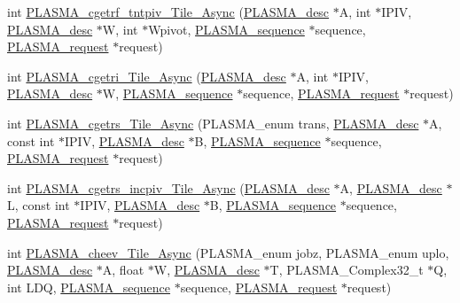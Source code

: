 \begin{DoxyCompactItemize}
\item 
int \hyperlink{group__PLASMA__Complex32__t__Tile__Async_gab52d3534e6fcfe9a2b00b7a97257ddee_gab52d3534e6fcfe9a2b00b7a97257ddee}{P\+L\+A\+S\+M\+A\+\_\+cgetrf\+\_\+tntpiv\+\_\+\+Tile\+\_\+\+Async} (\hyperlink{structplasma__desc__t}{P\+L\+A\+S\+M\+A\+\_\+desc} $\ast$A, int $\ast$I\+P\+I\+V, \hyperlink{structplasma__desc__t}{P\+L\+A\+S\+M\+A\+\_\+desc} $\ast$W, int $\ast$Wpivot, \hyperlink{structplasma__sequence__t}{P\+L\+A\+S\+M\+A\+\_\+sequence} $\ast$sequence, \hyperlink{structplasma__request__t}{P\+L\+A\+S\+M\+A\+\_\+request} $\ast$request)
\item 
int \hyperlink{group__PLASMA__Complex32__t__Tile__Async_ga6d18ea785cd0131e1752ae2eb0e14e76_ga6d18ea785cd0131e1752ae2eb0e14e76}{P\+L\+A\+S\+M\+A\+\_\+cgetri\+\_\+\+Tile\+\_\+\+Async} (\hyperlink{structplasma__desc__t}{P\+L\+A\+S\+M\+A\+\_\+desc} $\ast$A, int $\ast$I\+P\+I\+V, \hyperlink{structplasma__desc__t}{P\+L\+A\+S\+M\+A\+\_\+desc} $\ast$W, \hyperlink{structplasma__sequence__t}{P\+L\+A\+S\+M\+A\+\_\+sequence} $\ast$sequence, \hyperlink{structplasma__request__t}{P\+L\+A\+S\+M\+A\+\_\+request} $\ast$request)
\item 
int \hyperlink{group__PLASMA__Complex32__t__Tile__Async_gaaac38ebd4bb530071f91f9ecaecbb3d5_gaaac38ebd4bb530071f91f9ecaecbb3d5}{P\+L\+A\+S\+M\+A\+\_\+cgetrs\+\_\+\+Tile\+\_\+\+Async} (P\+L\+A\+S\+M\+A\+\_\+enum trans, \hyperlink{structplasma__desc__t}{P\+L\+A\+S\+M\+A\+\_\+desc} $\ast$A, const int $\ast$I\+P\+I\+V, \hyperlink{structplasma__desc__t}{P\+L\+A\+S\+M\+A\+\_\+desc} $\ast$B, \hyperlink{structplasma__sequence__t}{P\+L\+A\+S\+M\+A\+\_\+sequence} $\ast$sequence, \hyperlink{structplasma__request__t}{P\+L\+A\+S\+M\+A\+\_\+request} $\ast$request)
\item 
int \hyperlink{group__PLASMA__Complex32__t__Tile__Async_ga9bcd7cb920176038984cf1490a80c996_ga9bcd7cb920176038984cf1490a80c996}{P\+L\+A\+S\+M\+A\+\_\+cgetrs\+\_\+incpiv\+\_\+\+Tile\+\_\+\+Async} (\hyperlink{structplasma__desc__t}{P\+L\+A\+S\+M\+A\+\_\+desc} $\ast$A, \hyperlink{structplasma__desc__t}{P\+L\+A\+S\+M\+A\+\_\+desc} $\ast$L, const int $\ast$I\+P\+I\+V, \hyperlink{structplasma__desc__t}{P\+L\+A\+S\+M\+A\+\_\+desc} $\ast$B, \hyperlink{structplasma__sequence__t}{P\+L\+A\+S\+M\+A\+\_\+sequence} $\ast$sequence, \hyperlink{structplasma__request__t}{P\+L\+A\+S\+M\+A\+\_\+request} $\ast$request)
\item 
int \hyperlink{group__PLASMA__Complex32__t__Tile__Async_gaacecd56a6f9f1970c10527cd253a1f5b_gaacecd56a6f9f1970c10527cd253a1f5b}{P\+L\+A\+S\+M\+A\+\_\+cheev\+\_\+\+Tile\+\_\+\+Async} (P\+L\+A\+S\+M\+A\+\_\+enum jobz, P\+L\+A\+S\+M\+A\+\_\+enum uplo, \hyperlink{structplasma__desc__t}{P\+L\+A\+S\+M\+A\+\_\+desc} $\ast$A, float $\ast$W, \hyperlink{structplasma__desc__t}{P\+L\+A\+S\+M\+A\+\_\+desc} $\ast$T, P\+L\+A\+S\+M\+A\+\_\+\+Complex32\+\_\+t $\ast$Q, int L\+D\+Q, \hyperlink{structplasma__sequence__t}{P\+L\+A\+S\+M\+A\+\_\+sequence} $\ast$sequence, \hyperlink{structplasma__request__t}{P\+L\+A\+S\+M\+A\+\_\+request} $\ast$request)

\end{DoxyCompactItemize}
